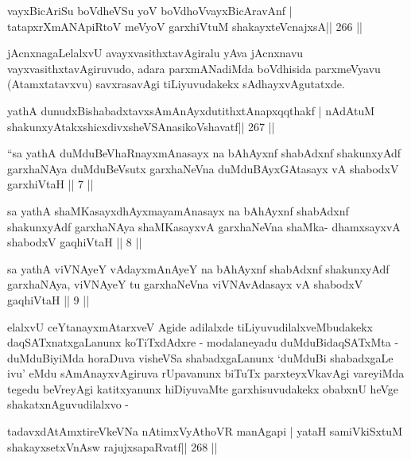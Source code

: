 \begin{shl}
vayxBicAriSu boVdheVSu yoV boVdhoV\s vayxBicAravAnf |
tatapxrXmANApiRtoV meVyoV garxhiVtuM shakayxteV\s cnajxsA\hfill || 266 ||
\end{shl}

\begin{artha}
jAcnxnagaLelalxvU avayxvasithxtavAgiralu yAva jAcnxnavu vayxvasithxtavAgiruvudo, adara parxmANadiMda boVdhisida parxmeVyavu (Atamxtatavxvu) savxrasavAgi tiLiyuvudakekx sAdhayxvAgutatxde.
\end{artha}


\begin{shl}
yathA dunudxBishabadxtavxsAmAnAyxdutithxtAnapxqqthakf |
nA\s\s dAtuM shakunxyAtakxshicxdivxsheVSAnasikoVshavatf\hfill || 267 ||
\end{shl}



\begin{shl}
``sa yathA duMduBeVhaRnayxmAnasayx na bAhAyxnf shabAdxnf
shakunxyAdf garxhaNAya duMduBeVsutx garxhaNeVna
duMduBAyxGAtasayx vA shabodxV garxhiVtaH || 7 ||
\end{shl}

\begin{shl}
sa yathA shaMKasayxdhAyxmayamAnasayx na bAhAyxnf shabAdxnf
shakunxyAdf garxhaNAya shaMKasayxvA garxhaNeVna shaMka-
dhamxsayxvA shabodxV gaqhiVtaH || 8 ||
\end{shl}

\begin{shl}
sa yathA viVNAyeY vAdayxmAnAyeY na bAhAyxnf
shabAdxnf shakunxyAdf garxhaNAya, viVNAyeY tu garxhaNeVna
viVNAvAdasayx vA shabodxV gaqhiVtaH || 9 ||
\end{shl}

\begin{artha}
elalxvU ceYtanayxmAtarxveV Agide adilalxde tiLiyuvudilalxveMbudakekx daqSATxnatxgaLanunx koTiTxdAdxre - modalaneyadu duMduBidaqSATxMta - duMduBiyiMda horaDuva visheVSa shabadxgaLanunx `duMduBi shabadxgaLe ivu' eMdu sAmAnayxvAgiruva rUpavanunx biTuTx parxteyxVkavAgi vareyiMda tegedu beVreyAgi katitxyanunx hiDiyuvaMte garxhisuvudakekx obabxnU heVge shakatxnAguvudilalxvo -
\end{artha}

\begin{shl}
tadavxdAtAmxtireVkeVNa nA\s\s timxVyAthoVR manAgapi |
yataH samiVkiSxtuM shakayxsetxVnAsw rajujxsapaRvatf\hfill || 268 ||
\end{shl}

